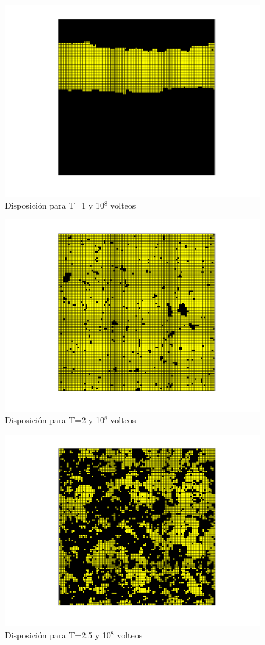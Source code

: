 \documentclass[a4paper,12pt,spanish]{article}
\begin{document}
	\begin{figure}[H]
		\centering
		\includegraphics[width=0.8\linewidth]{../obtencion_resultados/b}
		\caption{Disposición para T=1 y 10$^8$ volteos}
		\label{fig:b}
	\end{figure}



	\begin{figure}[H]
		\centering
		\includegraphics[width=0.8\linewidth]{../obtencion_resultados/c}
		\caption{Disposición para T=2 y 10$^8$ volteos}
		\label{fig:c}
	\end{figure}


	\begin{figure}[H]
		\centering
		\includegraphics[width=0.8\linewidth]{../obtencion_resultados/d}
		\caption{Disposición para T=2.5 y 10$^8$ volteos}
		\label{fig:d}
	\end{figure}
\end{document}
